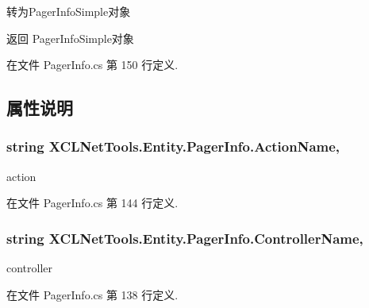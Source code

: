转为\-Pager\-Info\-Simple对象 

\begin{DoxyReturn}{返回}
Pager\-Info\-Simple对象
\end{DoxyReturn}


在文件 Pager\-Info.\-cs 第 150 行定义.



\subsection{属性说明}
\hypertarget{class_x_c_l_net_tools_1_1_entity_1_1_pager_info_aa3c26ca4634e5ab5023cc0157e3245b7}{
\subsubsection[{Action\-Name}]{\setlength{\rightskip}{0pt plus 5cm}string X\-C\-L\-Net\-Tools.\-Entity.\-Pager\-Info.\-Action\-Name\hspace{0.3cm}{\ttfamily [get]}, {\ttfamily [set]}}}\label{class_x_c_l_net_tools_1_1_entity_1_1_pager_info_aa3c26ca4634e5ab5023cc0157e3245b7}


action 



在文件 Pager\-Info.\-cs 第 144 行定义.

\hypertarget{class_x_c_l_net_tools_1_1_entity_1_1_pager_info_a7684b1dd21faadcf80c1e2d081660569}{
\subsubsection[{Controller\-Name}]{\setlength{\rightskip}{0pt plus 5cm}string X\-C\-L\-Net\-Tools.\-Entity.\-Pager\-Info.\-Controller\-Name\hspace{0.3cm}{\ttfamily [get]}, {\ttfamily [set]}}}\label{class_x_c_l_net_tools_1_1_entity_1_1_pager_info_a7684b1dd21faadcf80c1e2d081660569}


controller 



在文件 Pager\-Info.\-cs 第 138 行定义.

